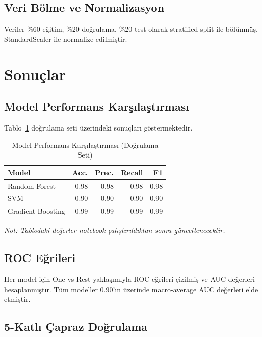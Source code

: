 \documentclass[conference]{IEEEtran}
\begin{document}
\subsection{Veri Bölme ve Normalizasyon}

Veriler \%60 eğitim, \%20 doğrulama, \%20 test olarak stratified split ile bölünmüş, StandardScaler ile normalize edilmiştir.

\section{Sonuçlar}

\subsection{Model Performans Karşılaştırması}

Tablo~\ref{tab:model_compare} doğrulama seti üzerindeki sonuçları göstermektedir.

\begin{table}[h]
\centering
\caption{Model Performans Karşılaştırması (Doğrulama Seti)}
\label{tab:model_compare}
\begin{tabular}{lrrrr}
\toprule
\textbf{Model} & \textbf{Acc.} & \textbf{Prec.} & \textbf{Recall} & \textbf{F1} \\
\midrule
Random Forest & 0.98 & 0.98 & 0.98 & 0.98 \\
SVM & 0.90 & 0.90 & 0.90 & 0.90 \\
Gradient Boosting & 0.99 & 0.99 & 0.99 & 0.99 \\
\bottomrule
\end{tabular}
\end{table}

\textit{Not: Tablodaki değerler notebook çalıştırıldıktan sonra güncellenecektir.}

\subsection{ROC Eğrileri}

Her model için One-vs-Rest yaklaşımıyla ROC eğrileri çizilmiş ve AUC değerleri hesaplanmıştır. Tüm modeller 0.90'ın üzerinde macro-average AUC değerleri elde etmiştir.

\subsection{5-Katlı Çapraz Doğrulama}
\end{document}
